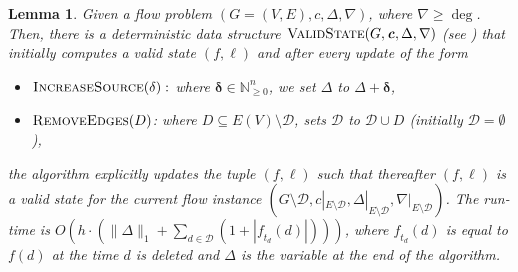 \documentclass[11pt]{article}
\newtheorem{lemma}[theorem]{Lemma}
\newcommand\bell{\boldsymbol{\mathit{\ell}}}
\newcommand\cc{\boldsymbol{\mathit{c}}}
\newcommand\ff{\boldsymbol{\mathit{f}}}
\begin{document}
\begin{lemma}\label{lm:PushPullRelabel}
Given a flow problem $(G = (V,E), \cc, \Delta, \nabla)$, where $\nabla \geq \deg$. Then, there is a deterministic data structure $\textsc{ValidState}(G, \cc, \Delta, \nabla)$ (see ) that initially computes a valid state $(\ff, \bell)$ and after every update of the form
\begin{itemize}
    \item $\textsc{IncreaseSource}(\mathbf{\delta}):$ where $\mathbf{\delta} \in \mathbb{N}_{\geq 0}^{n}$, we set $\Delta$ to $\Delta + \mathbf{\delta}$,
    \item $\textsc{RemoveEdges}(D)$: where $D \subseteq E(V) \setminus \mathcal{D}$, sets $\mathcal{D}$ to $\mathcal{D} \cup D$ (initially $\mathcal{D} = \emptyset$),
\end{itemize}
the algorithm explicitly updates the tuple $(\ff, \bell)$ such that thereafter $(\ff, \bell)$ is a valid state for the current flow instance $(G \setminus \mathcal{D}, \cc|_{E \setminus \mathcal{D}}, \Delta|_{E \setminus \mathcal{D}}, \nabla|_{E \setminus \mathcal{D}})$. The run-time is $O\left(h \cdot \left(\|\Delta\|_1 + \sum_{d \in \mathcal{D}} (1 + |\ff_{t_d}(d)|)\right)\right)$, where $\ff_{t_d}(d)$ is equal to $\ff(d)$ at the time $d$ is deleted and $\Delta$ is the variable at the end of the algorithm.
\end{lemma}
\end{document}
